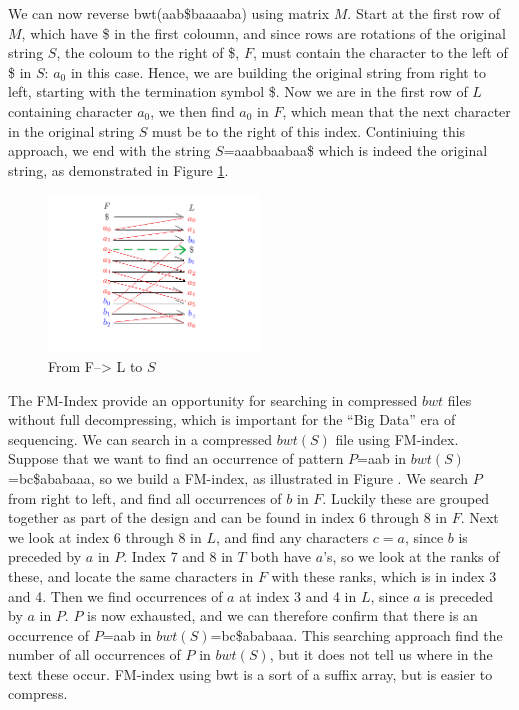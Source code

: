 \documentclass[12pt]{article} %
\begin{document}
We can now reverse bwt(aab\$baaaaba) using matrix $M$. Start at the first row of $M$, which have \$ in the first coloumn, and since rows are rotations of the original string $S$, the coloum to the right of \$, $F$, must contain the character to the left of \$ in $S$: $a_0$ in this case. Hence, we are building the original string from right to left, starting with the termination symbol \$. Now we are in the first row of $L$ containing character $a_0$, we then find $a_0$ in $F$, which mean that the next character in the original string $S$ must be to the right of this index. Continiuing this approach, we end with the string $S$=aaabbaabaa\$ which is indeed the original string, as demonstrated in Figure \ref{fig:bwt0}.
\begin{figure}[H]
    \centering
    \includegraphics[width=0.5\textwidth]{bwt0}
    \captionsetup{width=0.8\textwidth}
    \caption{ From F--> L to $S$}
    \label{fig:bwt0}
\end{figure}

The FM-Index provide an opportunity for searching in compressed $bwt$ files without full decompressing, which is important for the “Big Data” era of sequencing. 
We can search in a compressed $bwt(S)$ file using FM-index. Suppose that we want to find an occurrence of pattern $P$=aab in $bwt(S)$=bc\$ababaaa, so we build a FM-index, as illustrated in Figure \?.  We search $P$ from right to left, and find all occurrences of $b$ in $F$. Luckily these are grouped together as part of the design and can be found in index 6 through 8 in $F$. Next we look at index 6 through 8 in $L$, and find any characters $c=a$, since $b$ is preceded by $a$ in $P$. Index 7 and 8 in $T$ both have $a$’s, so we look at the ranks of these, and locate the same characters in $F$ with these ranks, which is in index 3 and 4.  Then we find occurrences of $a$ at index 3 and 4 in $L$, since $a$ is preceded by $a$ in $P$. $P$ is now exhausted, and we can therefore confirm that there is an occurrence of $P$=aab in $bwt(S)$=bc\$ababaaa.  This searching approach find the number of all occurrences of $P$ in $bwt(S)$, but it does not tell us where in the text these occur. 
FM-index using bwt is a sort of a suffix array, but is easier to compress. 
\end{document}
